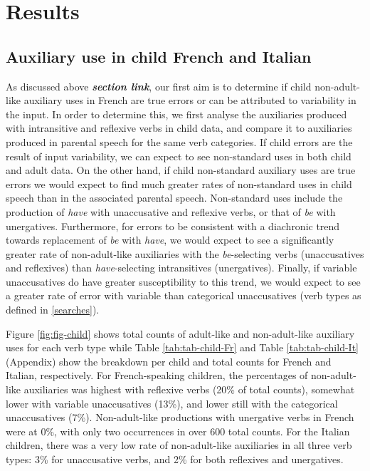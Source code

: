 \documentclass[
  12pt,
]{article}
\begin{document}
\newpage

\hypertarget{results}{%
\section{Results}\label{results}}

\hypertarget{childFrIt}{%
\subsection{Auxiliary use in child French and Italian}\label{childFrIt}}

As discussed above \textbf{\emph{section link}}, our first aim is to determine if child non-adult-like auxiliary uses in French are true errors or can be attributed to variability in the input. In order to determine this, we first analyse the auxiliaries produced with intransitive and reflexive verbs in child data, and compare it to auxiliaries produced in parental speech for the same verb categories. If child errors are the result of input variability, we can expect to see non-standard uses in both child and adult data. On the other hand, if child non-standard auxiliary uses are true errors we would expect to find much greater rates of non-standard uses in child speech than in the associated parental speech. Non-standard uses include the production of \emph{have} with unaccusative and reflexive verbs, or that of \emph{be} with unergatives. Furthermore, for errors to be consistent with a diachronic trend towards replacement of \emph{be} with \emph{have}, we would expect to see a significantly greater rate of non-adult-like auxiliaries with the \emph{be}-selecting verbs (unaccusatives and reflexives) than \emph{have}-selecting intransitives (unergatives). Finally, if variable unaccusatives do have greater susceptibility to this trend, we would expect to see a greater rate of error with variable than categorical unaccusatives (verb types as defined in \ref{searches}).

Figure \ref{fig:fig-child} shows total counts of adult-like and non-adult-like auxiliary uses for each verb type while Table \ref{tab:tab-child-Fr} and Table \ref{tab:tab-child-It} (Appendix) show the breakdown per child and total counts for French and Italian, respectively. For French-speaking children, the percentages of non-adult-like auxiliaries was highest with reflexive verbs (20\% of total counts), somewhat lower with variable unaccusatives (13\%), and lower still with the categorical unaccusatives (7\%). Non-adult-like productions with unergative verbs in French were at 0\%, with only two occurrences in over 600 total counts. For the Italian children, there was a very low rate of non-adult-like auxiliaries in all three verb types: 3\% for unaccusative verbs, and 2\% for both reflexives and unergatives.
\end{document}
